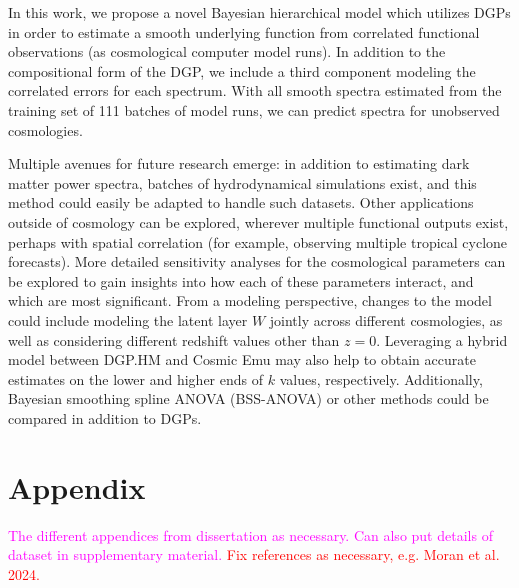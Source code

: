 \documentclass[11pt]{article}
\begin{document}
In this work, we propose a novel Bayesian hierarchical model which utilizes DGPs 
in order to estimate a smooth underlying function from correlated functional observations 
(as cosmological computer model runs). In addition to the compositional form of the DGP, 
we include a third component modeling the correlated errors for each spectrum. 
With all smooth spectra estimated from the training set of 111 batches of model runs, 
we can predict spectra for unobserved cosmologies.

Multiple avenues for future research emerge: in addition to estimating dark matter 
power spectra, batches of hydrodynamical simulations exist, and this method could 
easily be adapted to handle such datasets. Other applications outside of cosmology 
can be explored, wherever multiple functional outputs exist, perhaps with spatial 
correlation (for example, observing multiple tropical cyclone forecasts). More detailed 
sensitivity analyses for the cosmological parameters can be explored to gain insights 
into how each of these parameters interact, and which are most significant. From a 
modeling perspective, changes to the model could include modeling the latent layer 
$W$ jointly across different cosmologies, as well as considering different redshift 
values other than $z=0$. Leveraging a hybrid model between DGP.HM and Cosmic Emu 
may also help to obtain accurate estimates on the lower and higher ends of $k$ values, 
respectively. Additionally, Bayesian smoothing spline ANOVA (BSS-ANOVA) or other methods 
could be compared in addition to DGPs. 

\section{Appendix}
\label{sec:apdx}

\textcolor{magenta}{The different appendices from dissertation as necessary. 
Can also put details of dataset in supplementary material.} 
\textcolor{red}{Fix references as necessary, e.g. Moran et al. 2024.}
\end{document}
